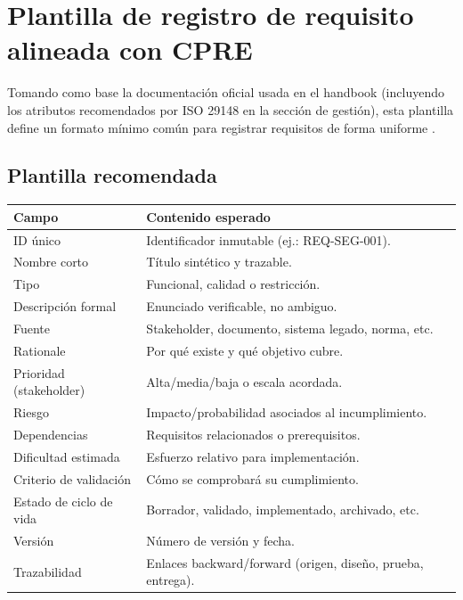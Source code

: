 \section{Plantilla de registro de requisito alineada con CPRE}
Tomando como base la documentaci\'on oficial usada en el handbook (incluyendo los atributos recomendados por ISO 29148 en la secci\'on de gesti\'on), esta plantilla define un formato m\'inimo com\'un para registrar requisitos de forma uniforme \cite[pp.~30--32, 136--137]{cpre}.

\subsection*{Plantilla recomendada}
\renewcommand{\arraystretch}{1.2}
\begin{tabular}{|p{}|p{}|}
\hline
\textbf{Campo} & \textbf{Contenido esperado} \\
\hline
ID \'unico & Identificador inmutable (ej.: REQ-SEG-001). \\
\hline
Nombre corto & T\'itulo sint\'etico y trazable. \\
\hline
Tipo & Funcional, calidad o restricci\'on. \\
\hline
Descripci\'on formal & Enunciado verificable, no ambiguo. \\
\hline
Fuente & Stakeholder, documento, sistema legado, norma, etc. \\
\hline
Rationale & Por qu\'e existe y qu\'e objetivo cubre. \\
\hline
Prioridad (stakeholder) & Alta/media/baja o escala acordada. \\
\hline
Riesgo & Impacto/probabilidad asociados al incumplimiento. \\
\hline
Dependencias & Requisitos relacionados o prerequisitos. \\
\hline
Dificultad estimada & Esfuerzo relativo para implementaci\'on. \\
\hline
Criterio de validaci\'on & C\'omo se comprobar\'a su cumplimiento. \\
\hline
Estado de ciclo de vida & Borrador, validado, implementado, archivado, etc. \\
\hline
Versi\'on & N\'umero de versi\'on y fecha. \\
\hline
Trazabilidad & Enlaces backward/forward (origen, dise\~no, prueba, entrega). \\
\hline
\end{tabular}

